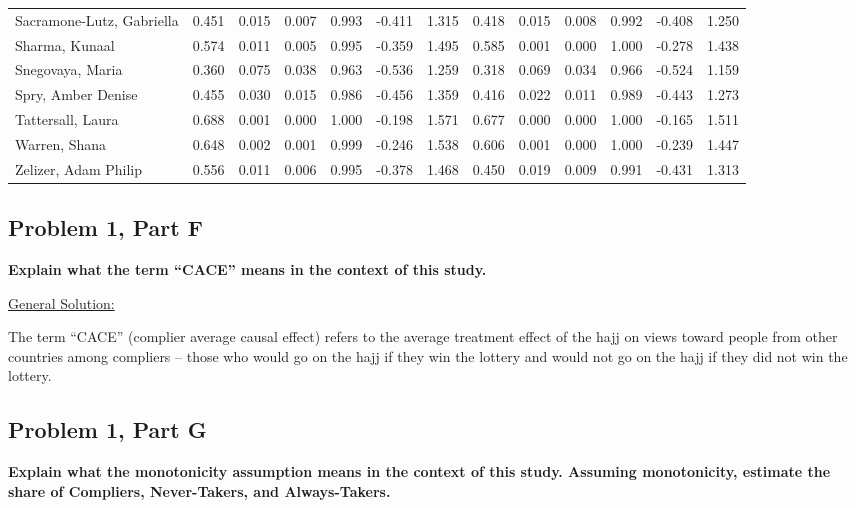 \documentclass[11pt,notitlepage]{article}
\begin{document}
\begin{table}[h!]
\begin{center}
\begin{tabular}{lrrrrrr|rrrrrr}
  Sacramone-Lutz, Gabriella & 0.451 & 0.015 & 0.007 & 0.993 & -0.411 & 1.315 & 0.418 & 0.015 & 0.008 & 0.992 & -0.408 & 1.250 \\ 
  Sharma, Kunaal & 0.574 & 0.011 & 0.005 & 0.995 & -0.359 & 1.495 & 0.585 & 0.001 & 0.000 & 1.000 & -0.278 & 1.438 \\ 
  Snegovaya, Maria & 0.360 & 0.075 & 0.038 & 0.963 & -0.536 & 1.259 & 0.318 & 0.069 & 0.034 & 0.966 & -0.524 & 1.159 \\ 
  Spry, Amber Denise & 0.455 & 0.030 & 0.015 & 0.986 & -0.456 & 1.359 & 0.416 & 0.022 & 0.011 & 0.989 & -0.443 & 1.273 \\ 
  Tattersall, Laura & 0.688 & 0.001 & 0.000 & 1.000 & -0.198 & 1.571 & 0.677 & 0.000 & 0.000 & 1.000 & -0.165 & 1.511 \\ 
  Warren, Shana & 0.648 & 0.002 & 0.001 & 0.999 & -0.246 & 1.538 & 0.606 & 0.001 & 0.000 & 1.000 & -0.239 & 1.447 \\ 
  Zelizer, Adam Philip & 0.556 & 0.011 & 0.006 & 0.995 & -0.378 & 1.468 & 0.450 & 0.019 & 0.009 & 0.991 & -0.431 & 1.313 \\ 
   \hline
\end{tabular}
\end{center}
\end{table}

\clearpage


\subsection{Problem 1, Part F} {\bf Explain what the term ``CACE'' means in the context of this study. } 

\vspace{1cm}

\underline{{\sc General Solution:}}

The term ``CACE'' (complier average causal effect) refers to the average treatment effect of the hajj on views toward people from other countries among compliers -- those who would go on the hajj if they win the lottery and would not go on the hajj if they did not win the lottery.

\clearpage

\subsection{Problem 1, Part G} {\bf Explain what the monotonicity assumption means in the context of this study.  Assuming monotonicity, estimate the share of Compliers, Never-Takers, and Always-Takers.}
\end{document}
